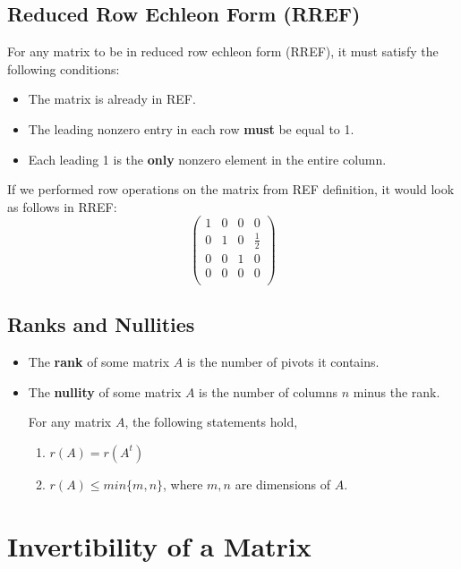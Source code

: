 \documentclass[a4paper]{article}
\begin{document}
  \subsection{Reduced Row Echleon Form (RREF)}
  For any matrix to be in reduced row echleon form (RREF), it must satisfy the following conditions:
  \begin{itemize}
    \item The matrix is already in REF.
    \item The leading nonzero entry in each row \textbf{must} be equal to 1.
    \item Each leading 1 is the \textbf{only} nonzero element in the entire column.
  \end{itemize}
  If we performed row operations on the matrix from REF definition, it would look as follows in RREF:
  \[
    \begin{pmatrix}
      1 & 0 & 0 & 0 \\  
      0 & 1 & 0 & \frac{1 }{2} \\  
      0 & 0 & 1 & 0 \\  
      0 & 0 & 0 & 0 \\  
    \end{pmatrix}
  \]
  \subsection{Ranks and Nullities}
  \begin{itemize}
    \item The \textbf{rank} of some matrix $A$ is the number of pivots it contains.
    \item The \textbf{nullity} of some matrix $A$ is the number of columns $n$ minus the rank.
  \begin{theorem}
    For any matrix $A$, the following statements hold,
    \begin{enumerate}
      \item $r(A) = r(A^t)$
      \item $r(A) \le min\{m,n\}$, where $m,n$ are dimensions of $A$.
    \end{enumerate}
  \end{theorem}
  
  \end{itemize}
  \section{Invertibility of a Matrix} 
\end{document}
